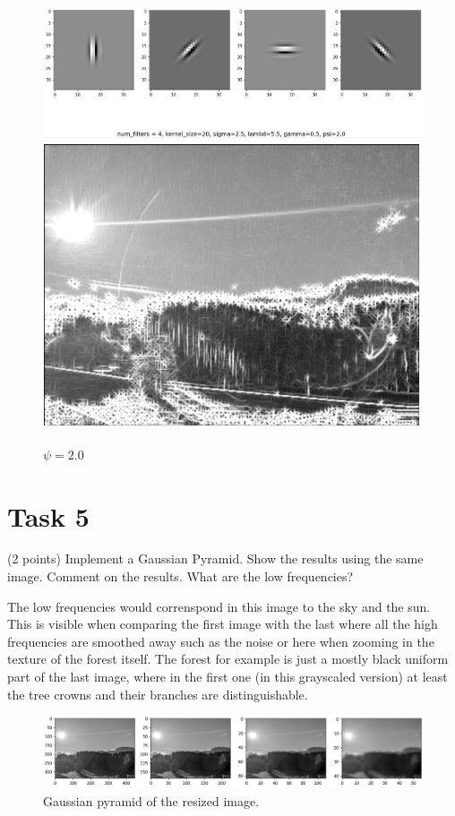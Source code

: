 \documentclass[UTF-8]{article}
\begin{document}
\begin{figure}[H]
	\centering
	\includegraphics[width=0.7\linewidth]{task4_7}
	\includegraphics[width=0.7\linewidth]{task4_8}
	\caption{$\psi = 2.0$}
	\label{fig:task44}
\end{figure}
\newpage

\section*{Task 5}
(2 points) Implement a Gaussian Pyramid. Show the results using the same image. Comment
on the results. What are the low frequencies?

The low frequencies would correnspond in this image to the sky and the sun. This is visible when comparing the first image with the last where all the high frequencies are smoothed away such as the noise or here when zooming in the texture of the forest itself. The forest for example is just a mostly black uniform part of the last image, where in the first one (in this grayscaled version) at least the tree crowns and their branches are distinguishable.

\begin{figure}[H]
	\centering
	\includegraphics[width=1\linewidth]{gaussian}
	\caption{Gaussian pyramid of the resized image.}
	\label{fig:gaussian}
\end{figure}
\end{document}
